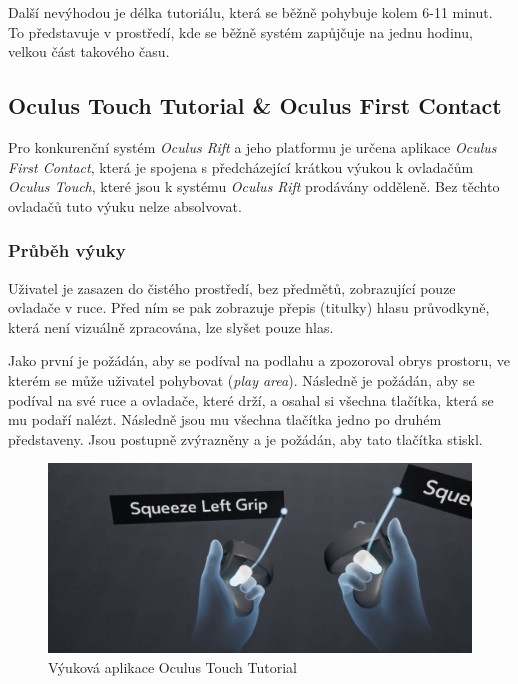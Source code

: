 Další nevýhodou je délka tutoriálu, která se běžně pohybuje kolem 6-11
minut. To představuje v prostředí, kde se běžně systém zapůjčuje na
jednu hodinu, velkou část takového času.

\subsection{Oculus Touch Tutorial \& Oculus First
Contact}\label{oculus-touch-tutorial-oculus-first-contact}

Pro konkurenční systém \emph{Oculus Rift} a jeho platformu je určena
aplikace \emph{Oculus First Contact}, která je spojena s předcházející
krátkou výukou k ovladačům \emph{Oculus Touch}, které jsou k systému
\emph{Oculus Rift} prodávány odděleně. Bez těchto ovladačů tuto výuku
nelze absolvovat.

\subsubsection{Průběh výuky}\label{prux16fbux11bh-vuxfduky-1}

Uživatel je zasazen do čistého prostředí, bez předmětů, zobrazující
pouze ovladače v ruce. Před ním se pak zobrazuje přepis (titulky) hlasu
průvodkyně, která není vizuálně zpracována, lze slyšet pouze hlas.

Jako první je požádán, aby se podíval na podlahu a zpozoroval obrys
prostoru, ve kterém se může uživatel pohybovat (\emph{play area}).
Následně je požádán, aby se podíval na své ruce a ovladače, které drží,
a osahal si všechna tlačítka, která se mu podaří nalézt. Následně jsou
mu všechna tlačítka jedno po druhém představeny. Jsou postupně
zvýrazněny a je požádán, aby tato tlačítka stiskl.

\begin{figure}[h!]
\centering
\includegraphics[width=12cm]{src/assets/oculus-tutorial.png}
\caption{Výuková aplikace Oculus Touch Tutorial}
\end{figure}

